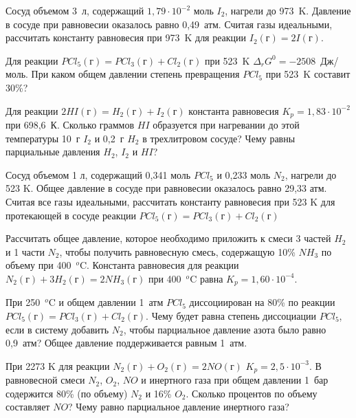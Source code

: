 \begin{Task}
Сосуд объемом 3~л, содержащий $1,79\cdot  10^{-2}$ моль $I_{2}$, нагрели до 973~K. Давление в сосуде при равновесии оказалось равно 0,49~атм. Считая газы идеальными, рассчитать константу равновесия при 973~K для реакции
$I_{2}(\textrm{г}) = 2I (\textrm{г})$.
\end{Task}
\begin{Task}
Для реакции
$PCl_{5}(\textrm{г}) = PCl_{3}(\textrm{г}) + Cl_{2}(\textrm{г})$ 
при 523~K $\Delta_{r}G^{0} = -2508$~Дж/моль. При каком общем давлении степень превращения $PCl_{5}$ при 523~K составит 30\%?
\end{Task}
\begin{Task}
Для реакции
$2HI(\textrm{г}) = H_{2}(\textrm{г}) + I_{2}(\textrm{г})$ 
константа равновесия $K_{p} = 1,83\cdot 10^{-2}$ при 698,6~К. Сколько граммов $HI$ образуется при нагревании до этой температуры 10~г $I_{2}$ и 0,2~г $H_{2}$ в трехлитровом сосуде? Чему равны парциальные давления $H_{2}$, $I_{2}$ и $HI$?
\end{Task}
\begin{Task}
Сосуд объемом 1 л, содержащий 0,341 моль $PCl_{5}$ и 0,233 моль $N_{2}$, нагрели до 523 K. Общее давление в сосуде при равновесии оказалось равно 29,33 атм. Считая все газы идеальными, рассчитать константу равновесия при 523 K для протекающей в сосуде реакции
$PCl_{5}(\textrm{г}) = PCl_{3} (\textrm{г}) + Cl_{2}(\textrm{г})$
\end{Task}
\begin{Task}
Рассчитать общее давление, которое необходимо приложить к смеси 3 частей $H_{2}$ и 1 части $N_{2}$, чтобы получить равновесную смесь, содержащую 10\% $NH_{3}$ по объему при 400~$^{o}$C. Константа равновесия для реакции $N_{2}(\textrm{г}) + 3H_{2}(\textrm{г}) = 2NH_{3}(\textrm{г})$
при 400~$^{o}$C равна $K_{p} = 1,60\cdot 10^{-4}$.
\end{Task}
\begin{Task}
При 250~$^{o}$C и общем давлении 1~атм $PCl_{5}$ диссоциирован на 80\% по реакции \\ $PCl_{5}(\textrm{г}) = PCl_{3}(\textrm{г}) + Cl_{2}(\textrm{г})$. 
Чему будет равна степень диссоциации $PCl_{5}$, если в систему добавить $N_{2}$, чтобы парциальное давление азота было равно 0,9~атм? Общее давление поддерживается равным 1~атм.
\end{Task}
\begin{Task}
При 2273 K для реакции 
$N_{2}(\textrm{г}) + O_{2}(\textrm{г}) = 2NO(\textrm{г})$ 
$K_{p}= 2,5\cdot 10^{-3}$. В равновесной смеси $N_{2}$, $O_{2}$, $NO$ и инертного газа при общем давлении 1~бар содержится 80\% (по объему) $N_{2}$ и 16\% $O_{2}$. Сколько процентов по объему составляет $NO$? Чему равно парциальное давление инертного газа?
\end{Task}